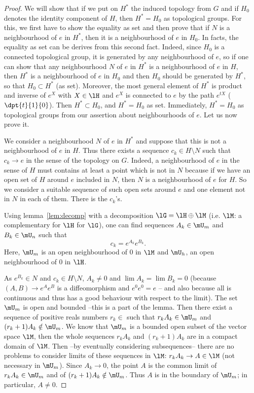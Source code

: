 \begin{proof}
We will show that if we put on $H^*$ the induced topology from $G$ and if $H_0$ denotes the identity component of $H$, then $H^*=H_0$ as topological groups. For this, we first have to show the equality as set and then prove that if $N$ is a neighbourhood of $e$ in $H^*$, then it is a neighbourhood of $e$ in $H_0$. In facts, the equality as set can be derives from this second fact. Indeed, since $H_0$ is a connected topological group, it is generated by any neighbourhood of $e$, so if one can show that any neighbourhood $N$ of $e$ in $H^*$ is a neighbourhood of $e$ in $H$, then $H^*$ is a neighbourhood of $e$ in $H_0$ and then $H_0$ should be generated by $H^*$, so that $H_0\subset H^*$ (as set). Moreover, the most general element of $H^*$ is product and inverse of $e^X$ with $X\in\lH$ and $e^X$ is connected to $e$ by the path $e^{tX}$ ($\dpt{t}{1}{0}$). Then $H^*\subset H_0$, and $H^*=H_0$ as set. Immediately, $H^*=H_0$ as topological groups from our assertion about neighbourhoods of $e$. Let us now prove it.

We consider a neighbourhood $N$ of $e$ in $H^*$ and suppose that this is not a neighbourhood of $e$ in $H$. Thus there exists a sequence $c_k\in H\setminus N$ such that $c_k\to e$ in the sense of the topology on $G$. Indeed, a neighbourhood of $e$ in the sense of $H$ must contains at least a point which is not in $N$ because if we have an open set of $H$ around $e$ included in $N$, then $N$ is a neighbourhood of $e$ for $H$. So we consider a suitable sequence of such open sets around $e$ and one element not in $N$ in each of them. There is the $c_k$'s.

Using lemma~\ref{lem:decomp} with a decomposition $\lG=\lH\oplus\lM$ (i.e. $\lM$: a complementary for $\lH$ for $\lG$), one can find sequences $A_k\in\mU_m$ and $B_k\in\mU_n$ such that
\[
   c_k=e^{A_k}e^{B_k}.
\]
Here, $\mU_m$ is an open neighbourhood of $0$ in $\lM$ and $\mU_h$, an open neighbourhood of $0$ in $\lH$.

As $e^{B_k}\in N$ and $c_k\in H\setminus N$, $A_k\neq 0$ and $\lim A_k=\lim B_k=0$ (because $(A,B)\to e^Ae^B$ is a diffeomorphism and $e^0e^0=e$ -- and also because all is continuous and thus has a good behaviour with respect to the limit). The set $\mU_m$ is open and bounded --this is a part of the lemma. Then there exist a sequence of positive reals numbers $r_k\in$ such that $r_kA_k\in\mU_m$ and $(r_k+1)A_k\notin\mU_m$. We know that $\mU_m$ is a bounded open subset of the vector space $\lM$, then the whole sequences $r_kA_k$ and $(r_k+1)A_k$ are in a compact domain of $\lM$. Then --by eventually considering subsequences-- there are no problems to consider limits of these sequences in $\lM$: $r_kA_k\to A\in\lM$ (not necessary in $\mU_m$). Since $A_k\to 0$, the point $A$ is the common limit of $r_kA_k\in\mU_m$ and of $(r_k+1)A_k\notin\mU_m$. Thus $A$ is in the boundary of $\mU_m$; in particular, $A\neq 0$.


\end{proof}
